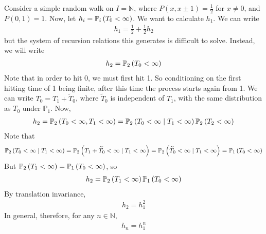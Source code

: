 \begin{example}
	Consider a simple random walk on $I = \mathbb N$, where $P(x,x\pm 1) = \frac{1}{2}$ for $x \neq 0$, and $P(0,1) = 1$.
	Now, let $h_i = \mathbb{P}_{i}\left({T_0 < \infty}\right)$.
	We want to calculate $h_1$.
	We can write
	\begin{align*}
		h_1 = \frac{1}{2} + \frac{1}{2} h_2
	\end{align*}
	but the system of recursion relations this generates is difficult to solve.
	Instead, we will write
	\begin{align*}
		h_2 = \mathbb{P}_{2}\left({T_0 < \infty}\right)
	\end{align*}
	Note that in order to hit 0, we must first hit 1.
	So conditioning on the first hitting time of 1 being finite, after this time the process starts again from 1.
	We can write $T_0 = T_1 + \widetilde T_0$, where $\widetilde T_0$ is independent of $T_1$, with the same distribution as $T_0$ under $\mathbb P_1$.
	Now,
	\begin{align*}
		h_2 = \mathbb{P}_{2}\left({T_0 < \infty, T_1 < \infty}\right) = \mathbb{P}_{2}\left({T_0 < \infty \mid T_1 < \infty}\right) \mathbb{P}_{2}\left({T_2 < \infty}\right)
	\end{align*}
	Note that
	\begin{align*}
		\mathbb{P}_{2}\left({T_0 < \infty \mid T_1 < \infty}\right) = \mathbb{P}_{2}\left({T_1 + \widetilde T_0 < \infty \mid T_1 < \infty}\right) = \mathbb{P}_{2}\left({\widetilde T_0 < \infty \mid T_1 < \infty}\right) = \mathbb{P}_{1}\left({T_0 < \infty}\right)
	\end{align*}
	But $\mathbb{P}_{2}\left({T_1 < \infty}\right) = \mathbb{P}_{1}\left({T_0 < \infty}\right)$, so
	\begin{align*}
		h_2 = \mathbb{P}_{2}\left({T_1 < \infty}\right) \mathbb{P}_{1}\left({T_0 < \infty}\right)
	\end{align*}
	By translation invariance,
	\begin{align*}
		h_2 = h_1^2
	\end{align*}
	In general, therefore, for any $n \in \mathbb N$,
	\begin{align*}
		h_n = h_1^n
	\end{align*}
\end{example}